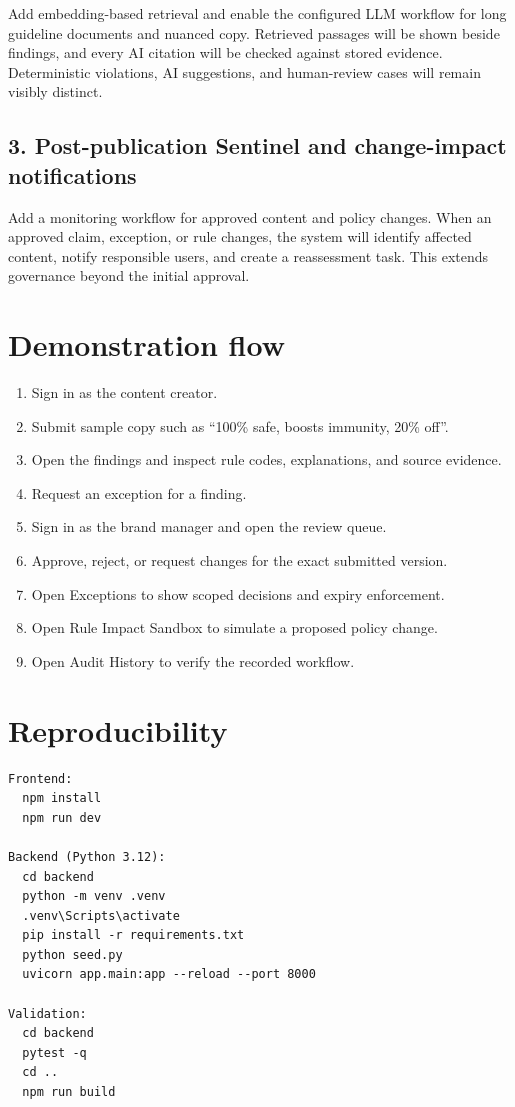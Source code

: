 \documentclass[11pt,a4paper]{article}
\begin{document}
Add embedding-based retrieval and enable the configured LLM workflow for long guideline
documents and nuanced copy. Retrieved passages will be shown beside findings, and every
AI citation will be checked against stored evidence. Deterministic violations, AI
suggestions, and human-review cases will remain visibly distinct.

\subsection{3. Post-publication Sentinel and change-impact notifications}

Add a monitoring workflow for approved content and policy changes. When an approved claim,
exception, or rule changes, the system will identify affected content, notify responsible
users, and create a reassessment task. This extends governance beyond the initial approval.

\section{Demonstration flow}

\begin{enumerate}[leftmargin=*,itemsep=3pt]
  \item Sign in as the content creator.
  \item Submit sample copy such as ``100\% safe, boosts immunity, 20\% off''.
  \item Open the findings and inspect rule codes, explanations, and source evidence.
  \item Request an exception for a finding.
  \item Sign in as the brand manager and open the review queue.
  \item Approve, reject, or request changes for the exact submitted version.
  \item Open Exceptions to show scoped decisions and expiry enforcement.
  \item Open Rule Impact Sandbox to simulate a proposed policy change.
  \item Open Audit History to verify the recorded workflow.
\end{enumerate}

\section{Reproducibility}

\begin{verbatim}
Frontend:
  npm install
  npm run dev

Backend (Python 3.12):
  cd backend
  python -m venv .venv
  .venv\Scripts\activate
  pip install -r requirements.txt
  python seed.py
  uvicorn app.main:app --reload --port 8000

Validation:
  cd backend
  pytest -q
  cd ..
  npm run build
\end{verbatim}
\end{document}
